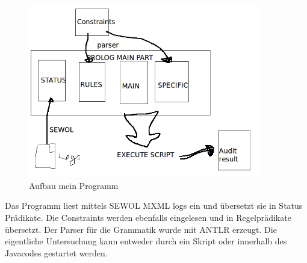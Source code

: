 \begin{figure}[ht]
	\centering
  \includegraphics[width=0.9\textwidth]{"Figures/myProg"}
	\caption{Aufbau mein Programm}
	\label{fig: myprog}
\end{figure}

Das Programm liest mittels SEWOL MXML logs ein und übersetzt sie in Status Prädikate. 
Die Constraints werden ebenfalls eingelesen und in Regelprädikate übersetzt. Der Parser für die Grammatik wurde mit ANTLR erzeugt.
Die eigentliche Untersuchung kann entweder durch ein Skript oder innerhalb des Javacodes gestartet werden.

